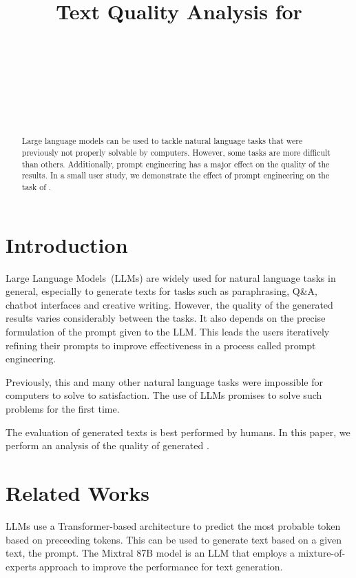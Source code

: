 \documentclass[11pt]{article}
\title{Text Quality Analysis for \todo{LLM-Generated Humor}}
\author{\todo{First Author}\\
  \todo{School (optional)} \\
  \todo{E-Mail (optional)} \\\And
  \todo{Second Author} \\
  \todo{School (optional)} \\
  \todo{E-Mail (optional)} \\
}
\begin{document}
\maketitle
\begin{abstract}
Large language models can be used to tackle natural language tasks that were previously not properly solvable by computers.
However, some tasks are more difficult than others. Additionally, prompt engineering has a major effect on the quality of the results.
In a small user study, we demonstrate the effect of prompt engineering on the task of .
\end{abstract}

\section{Introduction}

Large Language Models~(LLMs) are widely used for natural language tasks in general, especially to generate texts for tasks such as paraphrasing, Q\&A, chatbot interfaces and creative writing. However, the quality of the generated results varies considerably between the tasks. It also depends on the precise formulation of the prompt given to the LLM. This leads the users iteratively refining their prompts to improve effectiveness in a process called prompt engineering.

 Previously, this and many other natural language tasks were impossible for computers to solve to satisfaction. The use of LLMs promises to solve such problems for the first time.

The evaluation of generated texts is best performed by humans. In this paper, we perform an analysis of the quality of generated .

\section{Related Works}

LLMs use a Transformer-based architecture \cite{vaswani2017} to predict the most probable token based on preceeding tokens. This can be used to generate text based on a given text, the prompt.
The Mixtral 8\texttimes 7B model \cite{jiang2024} is an LLM that employs a mixture-of-experts approach to improve the performance for text generation.
\end{document}
